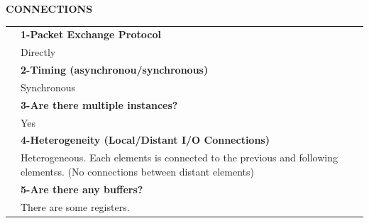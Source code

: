 {\large\textbf{CONNECTIONS}}\vspace{10pt}\\\begin{tabular}{ p{0.2cm} p{14.5cm}}
	&\textbf{1-Packet Exchange Protocol}\\
	&Directly\vspace{7pt}\\
	&\textbf{2-Timing (asynchronou/synchronous)}\\
	&Synchronous\vspace{7pt}\\
	&\textbf{3-Are there multiple instances? }\\
	&Yes\vspace{7pt}\\
	&\textbf{4-Heterogeneity (Local/Distant I/O Connections)}\\
	&Heterogeneous. Each elements is connected to the previous and following elementss. (No connections between distant elements)\vspace{7pt}\\
	&\textbf{5-Are there any buffers?}\\
	&There are some registers.
\end{tabular}\vspace{14pt}\\
